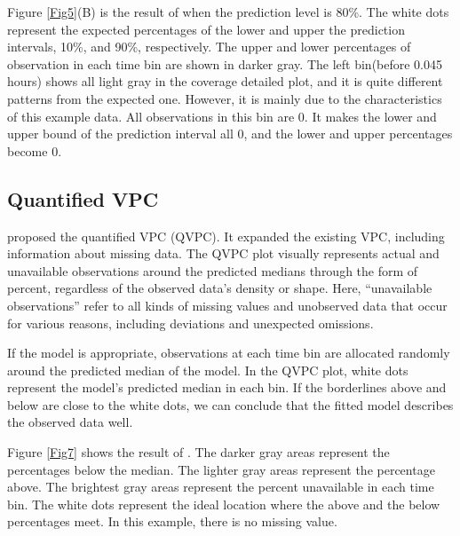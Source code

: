 Figure \ref{Fig5}(B) is the result of  when the prediction level is 80\%. The white dots represent the expected percentages of the lower and upper the prediction intervals, 10\%, and 90\%, respectively. The upper and lower percentages of observation in each time bin are shown in darker gray. The left bin(before 0.045 hours) shows all light gray in the coverage detailed plot, and it is quite different patterns from the expected one. However, it is mainly due to the characteristics of this example data. All observations in this bin are 0. It makes the lower and upper bound of the prediction interval all 0, and the lower and upper percentages become 0.




\hypertarget{QVPC}{%
\subsection{Quantified VPC}\label{QVPC}}

\cite{post2008extensions} proposed the quantified VPC (QVPC). It expanded the existing VPC, including information about missing data.
The QVPC plot visually represents actual and unavailable observations around the predicted medians through the form of percent, regardless of the observed data's density or shape. Here, ``unavailable observations'' refer to all kinds of missing values and unobserved data that occur for various reasons, including deviations and unexpected omissions.

If the model is appropriate, observations at each time bin are allocated randomly around the predicted median of the model. In the QVPC plot, white dots represent the model's predicted median in each bin. If the borderlines above and below are close to the white dots, we can conclude that the fitted model describes the observed data well.

Figure \ref{Fig7} shows the result of .  The darker gray areas represent the percentages below the median. The lighter gray areas represent the percentage above. The brightest gray areas represent the percent unavailable in each time bin. The white dots represent the ideal location where the above and the below percentages meet. In this example, there is no missing value.

